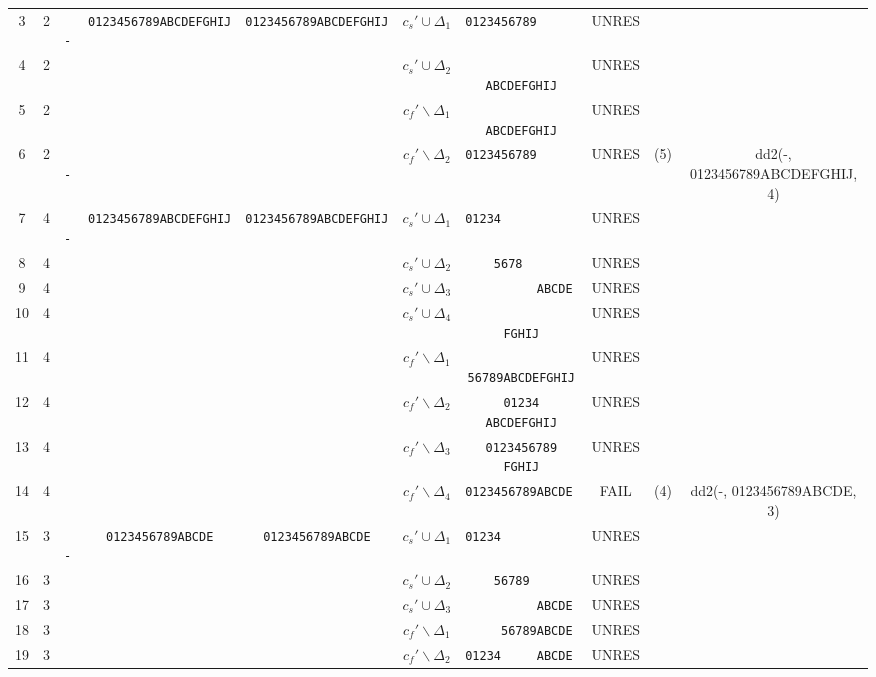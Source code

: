 \documentclass[10pt, a4paper]{article}
\begin{document}
\begin{landscape}
\begin{tabular}{|c|c|c|c|c|c|c|c|c|c|}
	3  & 2 & \verb+ -  +& \verb+0123456789ABCDEFGHIJ+  & \verb+0123456789ABCDEFGHIJ+ & $c_s' \cup \Delta_1 $ & \verb+0123456789          + & UNRES &  &  \\
	4  & 2 & \verb+    +&  & & $c_s' \cup \Delta_2 $ & \verb+          ABCDEFGHIJ+ & UNRES &  &  \\
	5  & 2 & \verb+    +&  & & $c_f' \backslash \Delta_1 $ & \verb+          ABCDEFGHIJ+ & UNRES &  &  \\
	6  & 2 & \verb+ -  +&  & & $c_f' \backslash \Delta_2 $ & \verb+0123456789          + & UNRES & (5) & dd2(-, 0123456789ABCDEFGHIJ, 4) \\ \hline
  7  & 4 & \verb+ -  +& \verb+0123456789ABCDEFGHIJ+  & \verb+0123456789ABCDEFGHIJ+ & $c_s' \cup \Delta_1 $ & \verb+01234               + & UNRES &  &  \\
  8  & 4 & \verb+    +&  & & $c_s' \cup \Delta_2 $ & \verb+    5678            + & UNRES &  &  \\
  9  & 4 & \verb+    +&  & & $c_s' \cup \Delta_3 $ & \verb+          ABCDE     + & UNRES &  &  \\
  10  & 4 & \verb+    +&  & & $c_s' \cup \Delta_4 $ & \verb+               FGHIJ+ & UNRES & &  \\
  11  & 4 & \verb+    +&  & & $c_f' \backslash \Delta_1 $ & \verb+     56789ABCDEFGHIJ+ & UNRES &  &  \\
  12  & 4 & \verb+    +&  & & $c_f' \backslash \Delta_2 $ & \verb+01234     ABCDEFGHIJ+ & UNRES &  &  \\
  13  & 4 & \verb+    +&  & & $c_f' \backslash \Delta_3 $ & \verb+0123456789     FGHIJ+ & UNRES &  &  \\
  14  & 4 & \verb+    +&  & & $c_f' \backslash \Delta_4 $ & \verb+0123456789ABCDE     + & FAIL & (4) & dd2(-, 0123456789ABCDE, 3) \\ \hline
  15  & 3 & \verb+ -  +& \verb+0123456789ABCDE+  & \verb+0123456789ABCDE+ & $c_s' \cup \Delta_1 $ & \verb+01234               + & UNRES &  &  \\
  16  & 3 & \verb+    +&  & & $c_s' \cup \Delta_2 $ & \verb+    56789           + & UNRES &  &  \\
  17  & 3 & \verb+    +&  & & $c_s' \cup \Delta_3 $ & \verb+          ABCDE     + & UNRES &  &  \\
  18  & 3 & \verb+    +&  & & $c_f' \backslash \Delta_1 $ & \verb+     56789ABCDE     + & UNRES &  &  \\
  19  & 3 & \verb+    +&  & & $c_f' \backslash \Delta_2 $ & \verb+01234     ABCDE     + & UNRES &  &  \\

\end{tabular}
\end{landscape}
\end{document}
